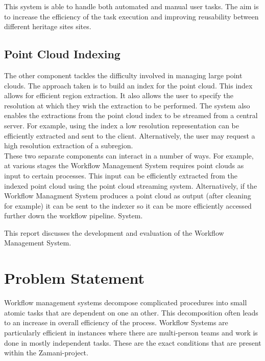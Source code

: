         This system is able to handle both automated and manual user tasks. The
        aim is to increase the efficiency of the task execution and improving
        reusability between different heritage sites sites.
      
    \subsection{Point Cloud Indexing}
        The other component tackles the difficulty involved in managing large
        point clouds. The approach taken is to build an index for the point cloud. This index
        allows for efficient region extraction. It also allows the user to specify the resolution at which
        they wish the extraction to be performed.
        The system also enables the extractions from the point cloud index to
        be streamed from a central server. For example, using the index a low resolution
        representation can be efficiently extracted and sent to the client. Alternatively, the user may request
        a high resolution extraction of a subregion.
\\

    \noindent These two separate components can interact in a number of ways. For
        example, at various
        stages the Workflow Management System requires point clouds as input
        to certain processes.
        This input can be efficiently extracted from the indexed point cloud
        using the point cloud
        streaming system. Alternatively, if the Workflow Managment System
        produces a point cloud
        as output (after cleaning for example) it can be sent to the indexer
        so it can be more efficiently
        accessed further down the workflow pipeline. System.
    
    This report discusses the development and evaluation of the Workflow Management System.

\section{Problem Statement}

    Workflow management systems decompose complicated procedures into small atomic tasks
    that are dependent on one an other\cite{Taylor:2006:WES:1196459}. This decomposition
    often leads to an increase in overall efficiency of the process. Workflow Systems
    are particularly efficient in instances where there are multi-person teams and work
    is done in mostly independent tasks. These are the exact conditions that
    are present within the Zamani-project.

